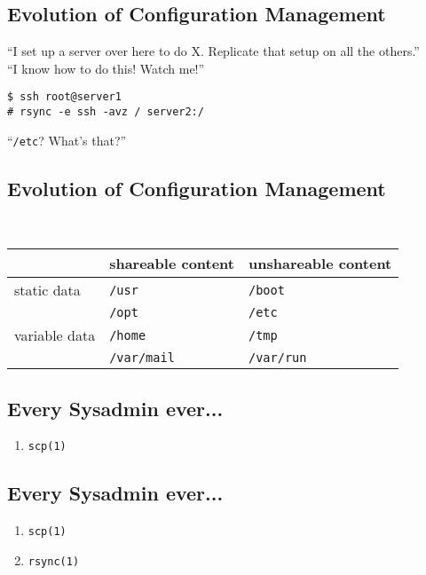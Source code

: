 \documentclass[xga]{xdvislides}
\begin{document}
\subsection{Evolution of Configuration Management}
``I set up a server over here to do X.  Replicate that
setup on all the others.'' \\

``I know how to do this!  Watch me!'' \\
\begin{verbatim}
$ ssh root@server1
# rsync -e ssh -avz / server2:/
\end{verbatim}
\vspace{.5in}
``{\tt /etc}?  What's that?''

\subsection{Evolution of Configuration Management}
\\

\vspace{.5in}
\Huge
        \begin{tabular}{ l | l | l }
        & shareable content & unshareable content \\
        \hline
        static data & {\tt /usr} & {\tt /boot} \\
        & {\tt /opt} & {\tt /etc} \\
        \hline
        variable data & {\tt /home} & {\tt /tmp} \\
        & {\tt /var/mail} & {\tt /var/run} \\
        \hline
        \end{tabular}
\Normalsize

\subsection{Every Sysadmin ever...}
\begin{enumerate}
	\item {\tt scp(1)}
\end{enumerate}

\subsection{Every Sysadmin ever...}
\begin{enumerate}
	\item {\tt scp(1)}
	\item {\tt rsync(1)}
\end{enumerate}
\end{document}
